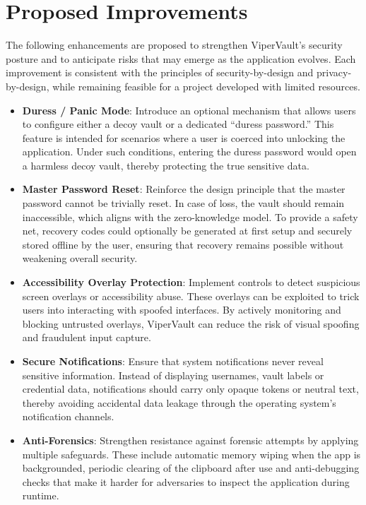 \section{Proposed Improvements}
	
	The following enhancements are proposed to strengthen ViperVault’s security posture and to anticipate risks that may emerge as the application evolves. Each improvement is consistent with the principles of security-by-design and privacy-by-design, while remaining feasible for a project developed with limited resources.
	
	\begin{itemize}
		\item \textbf{Duress / Panic Mode}: Introduce an optional mechanism that allows users to configure either a decoy vault or a dedicated “duress password.” This feature is intended for scenarios where a user is coerced into unlocking the application. Under such conditions, entering the duress password would open a harmless decoy vault, thereby protecting the true sensitive data.
		
		\item \textbf{Master Password Reset}: Reinforce the design principle that the master password cannot be trivially reset. In case of loss, the vault should remain inaccessible, which aligns with the zero-knowledge model. To provide a safety net, recovery codes could optionally be generated at first setup and securely stored offline by the user, ensuring that recovery remains possible without weakening overall security.
		
		\item \textbf{Accessibility Overlay Protection}: Implement controls to detect suspicious screen overlays or accessibility abuse. These overlays can be exploited to trick users into interacting with spoofed interfaces. By actively monitoring and blocking untrusted overlays, ViperVault can reduce the risk of visual spoofing and fraudulent input capture.
		
		\item \textbf{Secure Notifications}: Ensure that system notifications never reveal sensitive information. Instead of displaying usernames, vault labels or credential data, notifications should carry only opaque tokens or neutral text, thereby avoiding accidental data leakage through the operating system’s notification channels.
		
		\item \textbf{Anti-Forensics}: Strengthen resistance against forensic attempts by applying multiple safeguards. These include automatic memory wiping when the app is backgrounded, periodic clearing of the clipboard after use and anti-debugging checks that make it harder for adversaries to inspect the application during runtime.
	\end{itemize}